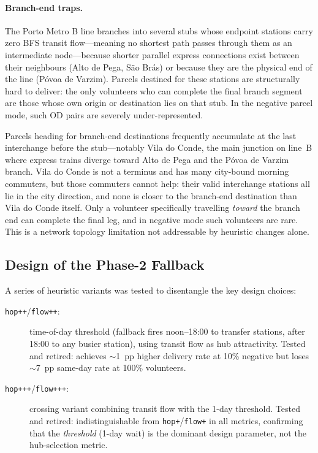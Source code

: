 \documentclass[11pt,a4paper]{article}
\begin{document}
\paragraph{Branch-end traps.}
The Porto Metro B line branches into several stubs whose endpoint stations
carry zero BFS transit flow---meaning no shortest path passes through them
as an intermediate node---because shorter parallel express connections exist
between their neighbours (Alto de Pega, São Brás) or because they are the
physical end of the line (Póvoa de Varzim).  Parcels destined for these
stations are structurally hard to deliver: the only volunteers who can
complete the final branch segment are those whose own origin or destination
lies on that stub.  In the negative parcel mode, such OD pairs are severely
under-represented.

Parcels heading for branch-end destinations frequently accumulate at the
last interchange before the stub---notably Vila do Conde, the main junction
on line~B where express trains diverge toward Alto de Pega and the Póvoa de
Varzim branch.  Vila do Conde is not a terminus and has many city-bound
morning commuters, but those commuters cannot help: their valid interchange
stations all lie in the city direction, and none is closer to the branch-end
destination than Vila do Conde itself.  Only a volunteer specifically
travelling \emph{toward} the branch end can complete the final leg, and in
negative mode such volunteers are rare.  This is a network topology
limitation not addressable by heuristic changes alone.

\subsection{Design of the Phase-2 Fallback}

A series of heuristic variants was tested to disentangle the key design
choices:

\begin{description}
  \item[\texttt{hop++}/\texttt{flow++}:] time-of-day threshold (fallback
        fires noon--18:00 to transfer stations, after 18:00 to any busier
        station), using transit flow as hub attractivity. Tested and retired:
        achieves $\sim$1~pp higher delivery rate at 10\% negative but loses
        $\sim$7~pp same-day rate at 100\% volunteers.
  \item[\texttt{hop+++}/\texttt{flow+++}:] crossing variant combining transit
        flow with the 1-day threshold. Tested and retired: indistinguishable
        from \texttt{hop+}/\texttt{flow+} in all metrics, confirming that the
        \emph{threshold} (1-day wait) is the dominant design parameter, not
        the hub-selection metric.
\end{description}
\end{document}
